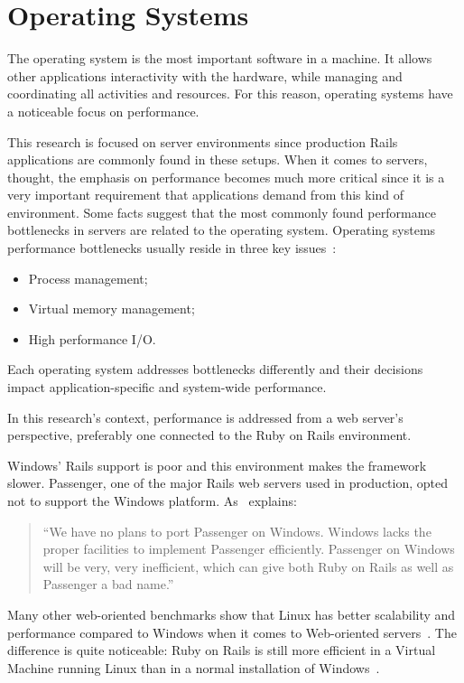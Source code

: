 \section{Operating Systems} %
\label{state:sec:operating_systems}
The operating system is the most important software in a machine. It allows other applications interactivity with the hardware, while managing and coordinating all activities and resources. For this reason, operating systems have a noticeable focus on performance.

This research is focused on server environments since production Rails applications are commonly found in these setups. When it comes to servers, thought, the emphasis on performance becomes much more critical since it is a very important requirement that applications demand from this kind of environment. Some facts suggest that the most commonly found performance bottlenecks in servers are related to the operating system. Operating systems performance bottlenecks usually reside in three key issues~\cite{os_performance_server}:
\begin{itemize}
\item Process management;
\item Virtual memory management;
\item High performance I/O.
\end{itemize}
Each operating system addresses bottlenecks differently and their decisions impact application-specific and system-wide performance.

In this research's context, performance is addressed from a web server's perspective, preferably one connected to the Ruby on Rails environment.

Windows' Rails support is poor and this environment makes the framework slower. Passenger, one of the major Rails web servers used in production, opted not to support the Windows platform. As~\cite{marcus_koze_passenger} explains:
\begin{quote}
  ``We have no plans to port Passenger on Windows. Windows lacks the proper facilities to implement Passenger efficiently. Passenger on Windows will be very, very inefficient, which can give both Ruby on Rails as well as Passenger a bad name.''
\end{quote}
Many other web-oriented benchmarks show that Linux has better scalability and performance compared to Windows when it comes to Web-oriented servers~\cite{apache_tomcat_performance_linux_windows, php_apache_linux_windows}. The difference is quite noticeable: Ruby on Rails is still more efficient in a Virtual Machine running Linux than in a normal installation of Windows~\cite{linux_virtualbox_windows_rails}.

